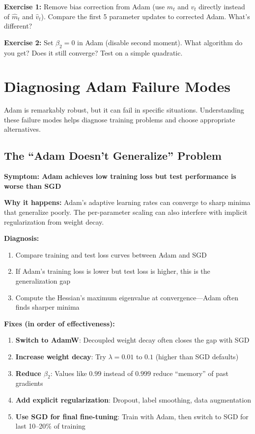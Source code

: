 \documentclass[../../main.tex]{subfiles}
\begin{document}
\begin{whatbreaks}
\textbf{Exercise 1:} Remove bias correction from Adam (use $m_t$ and $v_t$ directly instead of $\hat{m}_t$ and $\hat{v}_t$). Compare the first 5 parameter updates to corrected Adam. What's different?

\textbf{Exercise 2:} Set $\beta_2 = 0$ in Adam (disable second moment). What algorithm do you get? Does it still converge? Test on a simple quadratic.
\end{whatbreaks}

\section{Diagnosing Adam Failure Modes}
\label{sec:adam-failure-modes}

Adam is remarkably robust, but it can fail in specific situations. Understanding these failure modes helps diagnose training problems and choose appropriate alternatives.

\subsection{The ``Adam Doesn't Generalize'' Problem}

\begin{important}
\textbf{Symptom: Adam achieves low training loss but test performance is worse than SGD}

\textbf{Why it happens:} Adam's adaptive learning rates can converge to sharp minima that generalize poorly. The per-parameter scaling can also interfere with implicit regularization from weight decay.

\textbf{Diagnosis:}
\begin{enumerate}
    \item Compare training and test loss curves between Adam and SGD
    \item If Adam's training loss is lower but test loss is higher, this is the generalization gap
    \item Compute the Hessian's maximum eigenvalue at convergence---Adam often finds sharper minima
\end{enumerate}

\textbf{Fixes (in order of effectiveness):}
\begin{enumerate}
    \item \textbf{Switch to AdamW}: Decoupled weight decay often closes the gap with SGD
    \item \textbf{Increase weight decay}: Try $\lambda = 0.01$ to $0.1$ (higher than SGD defaults)
    \item \textbf{Reduce $\beta_2$}: Values like $0.99$ instead of $0.999$ reduce ``memory'' of past gradients
    \item \textbf{Add explicit regularization}: Dropout, label smoothing, data augmentation
    \item \textbf{Use SGD for final fine-tuning}: Train with Adam, then switch to SGD for last 10--20\% of training
\end{enumerate}
\end{important}
\end{document}
